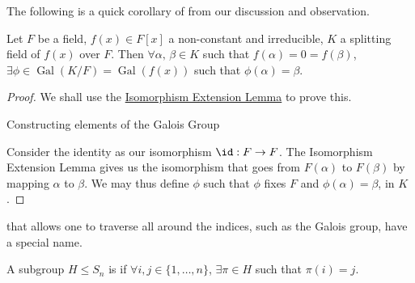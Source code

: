 \documentclass[notoc,notitlepage,nobib]{tufte-book}
\DeclareMathOperator{\Gal}{Gal}
\begin{document}
The following is a quick corollary of from our discussion and observation.

\begin{crly}\label{crly:the_galois_group_completely_captures_all_permutation_of_the_roots}
  Let $F$ be a field, $f(x) \in F[x]$ a non-constant and irreducible, $K$ a
  splitting field of $f(x)$ over $F$. Then $\forall \alpha, \, \beta \in K$ such
  that $f(\alpha) = 0 = f(\beta)$, $\exists \phi \in \Gal(K / F) = \Gal(f(x))$
  such that $\phi(\alpha) = \beta$.
\end{crly}

\begin{proof}
  We shall use the \hyperref[lemma:isomorphism_extension_lemma]{Isomorphism
  Extension Lemma} to prove this.
  \begin{marginfigure}
    \centering
    \caption{Constructing elements of the Galois Group}\label{fig:constructing_elements_of_the_galois_group}
  \end{marginfigure}
  Consider the identity as our isomorphism $\id : F \to F$. The Isomorphism
  Extension Lemma gives us the isomorphism that goes from $F(\alpha)$ to
  $F(\beta)$ by mapping $\alpha$ to $\beta$. We may thus define $\phi$ such that
  $\phi$ fixes $F$ and $\phi(\alpha) = \beta$, in $K$.
\end{proof}

 that allows one to traverse all around the
indices, such as the Galois group, have a special name.

\begin{defn}\label{defn:transitive_subgroup}
  A subgroup $H \leq S_n$ is  if $\forall i, j \in \{ 1,
  \ldots, n \}$, $\exists \pi \in H$ such that $\pi(i) = j$.
\end{defn}
\end{document}

